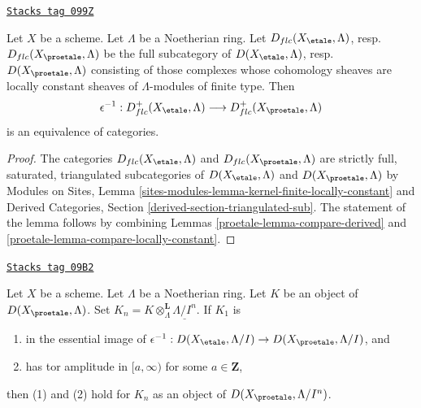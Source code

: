 \begin{lemma}
\label{proetale-lemma-compare-locally-constant-derived}
\href{https://stacks.math.columbia.edu/tag/099Z}{\texttt{Stacks tag 099Z}}

Let $X$ be a scheme. Let $\Lambda$ be a Noetherian ring.
Let $D_{flc}(X_\etale, \Lambda)$, resp.\ $D_{flc}(X_\proetale, \Lambda)$
be the full subcategory of
$D(X_\etale, \Lambda)$, resp.\ $D(X_\proetale, \Lambda)$
consisting of those complexes whose cohomology sheaves are locally
constant sheaves of $\Lambda$-modules of finite type. Then
$$
\epsilon^{-1} :
D_{flc}^+(X_\etale, \Lambda)
\longrightarrow
D_{flc}^+(X_\proetale, \Lambda)
$$
is an equivalence of categories.
\end{lemma}

\begin{proof}

The categories $D_{flc}(X_\etale, \Lambda)$ and $D_{flc}(X_\proetale, \Lambda)$
are strictly full, saturated, triangulated subcategories of
$D(X_\etale, \Lambda)$ and $D(X_\proetale, \Lambda)$
by Modules on Sites, Lemma
\ref{sites-modules-lemma-kernel-finite-locally-constant}
and
Derived Categories, Section \ref{derived-section-triangulated-sub}.
The statement of the lemma follows by combining
Lemmas \ref{proetale-lemma-compare-derived} and
\ref{proetale-lemma-compare-locally-constant}.
\end{proof}

\begin{lemma}
\label{proetale-lemma-compare-truncations}
\href{https://stacks.math.columbia.edu/tag/09B2}{\texttt{Stacks tag 09B2}}

Let $X$ be a scheme. Let $\Lambda$ be a Noetherian ring.
Let $K$ be an object of $D(X_\proetale, \Lambda)$.
Set $K_n = K \otimes_\Lambda^\mathbf{L} \underline{\Lambda/I^n}$.
If $K_1$ is
\begin{enumerate}
\item in the essential image of
$\epsilon^{-1} :D(X_\etale, \Lambda/I) \to D(X_\proetale, \Lambda/I)$, and
\item has tor amplitude in $[a,\infty)$ for some $a \in \mathbf{Z}$,
\end{enumerate}
then (1) and (2) hold for $K_n$ as an object of $D(X_\proetale, \Lambda/I^n)$.
\end{lemma}

